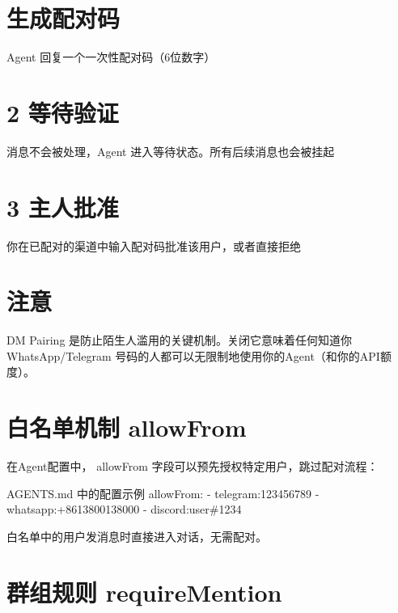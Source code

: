 \documentclass[
  10
]{article}
\newenvironment{Shaded}{}{}
\newcommand{\NormalTok}[1]{#1}
\begin{document}
\section{生成配对码}\label{ux751fux6210ux914dux5bf9ux7801}

Agent 回复一个一次性配对码（6位数字）

\section{2 等待验证}\label{ux7b49ux5f85ux9a8cux8bc1}

消息不会被处理，Agent 进入等待状态。所有后续消息也会被挂起

\section{3 主人批准}\label{ux4e3bux4ebaux6279ux51c6}

你在已配对的渠道中输入配对码批准该用户，或者直接拒绝

\section{注意}\label{ux6ce8ux610f-1}

DM Pairing 是防止陌生人滥用的关键机制。关闭它意味着任何知道你
WhatsApp/Telegram 号码的人都可以无限制地使用你的Agent（和你的API额度）。

\section{白名单机制
allowFrom}\label{ux767dux540dux5355ux673aux5236-allowfrom}

在Agent配置中， allowFrom 字段可以预先授权特定用户，跳过配对流程：

\begin{Shaded}
\begin{Highlighting}[]
\NormalTok{AGENTS.md 中的配置示例  }
\NormalTok{allowFrom:  }
\NormalTok{{-} telegram:123456789  }
\NormalTok{{-} whatsapp:+8613800138000  }
\NormalTok{{-} discord:user\#1234}
\end{Highlighting}
\end{Shaded}

白名单中的用户发消息时直接进入对话，无需配对。

\section{群组规则
requireMention}\label{ux7fa4ux7ec4ux89c4ux5219-requiremention}
\end{document}

